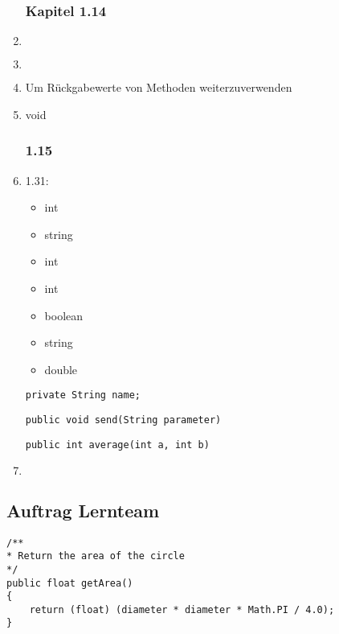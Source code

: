 \begin{enumerate}
\subsubsection{Kapitel 1.14}
\item $~$
\item $~$
\item Um Rückgabewerte von Methoden weiterzuverwenden
\item void

\subsubsection{1.15}
\item 
1.31: \\
\begin{itemize}\item int \item string \item int \item int \item boolean \item string \item double\end{itemize}
\begin{lstlisting}[caption=Aufgabe 1.32]
private String name;
\end{lstlisting}
\begin{lstlisting}[caption=Aufgabe 1.33]
public void send(String parameter)
\end{lstlisting}
\begin{lstlisting}[caption=Aufgabe 1.34]
public int average(int a, int b)
\end{lstlisting}

\item $~$
\end{enumerate}

\subsection{Auftrag Lernteam}

\begin{lstlisting}[caption=Test von lstlisting]
/**
* Return the area of the circle
*/
public float getArea()
{
    return (float) (diameter * diameter * Math.PI / 4.0);
}
\end{lstlisting}